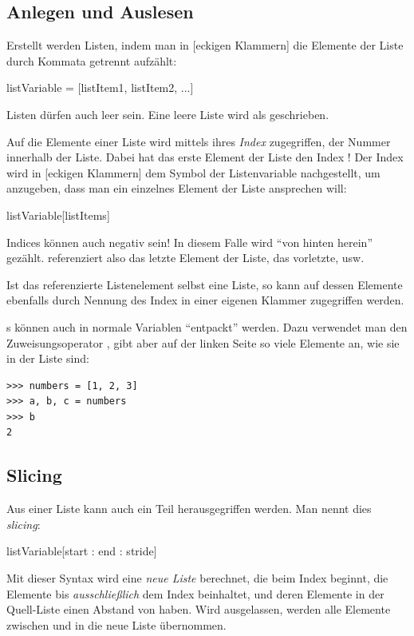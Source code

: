 \subsection{Anlegen und Auslesen}
Erstellt werden Listen, indem man in [eckigen Klammern] die Elemente der Liste durch Kommata getrennt aufzählt:
\begin{codebox}
listVariable = [listItem1, listItem2, ...]
\end{codebox}

Listen dürfen auch leer sein. Eine leere Liste wird als \inPy{[]} geschrieben.

Auf die Elemente einer Liste wird mittels ihres \emph{Index} zugegriffen, \ie der Nummer innerhalb der Liste. Dabei hat das erste Element der Liste den Index ! Der Index wird in [eckigen Klammern] dem Symbol der Listenvariable nachgestellt, um anzugeben, dass man ein einzelnes Element der Liste ansprechen will:

\begin{codebox}
listVariable[listItems]
\end{codebox}

Indices können auch negativ sein! In diesem Falle wird \enquote{von hinten herein} gezählt.  referenziert also das letzte Element der Liste,  das vorletzte, usw.

Ist das referenzierte Listenelement selbst eine Liste, so kann auf dessen Elemente ebenfalls durch Nennung des Index in einer eigenen Klammer zugegriffen werden.

s können auch in normale Variablen \enquote{entpackt} werden. Dazu verwendet man den Zuweisungsoperator \inPy{=}, gibt aber auf der linken Seite so viele Elemente an, wie sie in der Liste sind:
\begin{cmdbox}
\begin{verbatim}
>>> numbers = [1, 2, 3]
>>> a, b, c = numbers
>>> b
2
\end{verbatim}
\end{cmdbox}


\subsection{Slicing}
Aus einer Liste kann auch ein Teil herausgegriffen werden. Man nennt dies \emph{slicing}:
\begin{codebox}
listVariable[start : end : stride]
\end{codebox}
Mit dieser Syntax wird eine \emph{neue Liste} berechnet, die beim Index  beginnt, die Elemente bis \emph{ausschließlich} dem Index  beinhaltet, und deren Elemente in der Quell-Liste einen Abstand von  haben. Wird  ausgelassen, werden alle Elemente zwischen  und  in die neue Liste übernommen.

